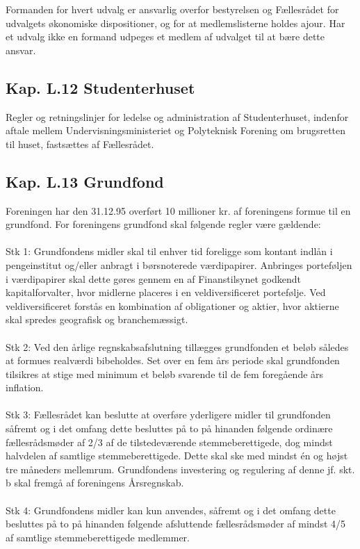 \begin{list}
\item Formanden for hvert udvalg er ansvarlig overfor bestyrelsen og Fællesrådet for udvalgets økonomiske dispositioner, og for at medlemslisterne holdes ajour. Har et udvalg ikke en formand udpeges et medlem af udvalget til at bære dette ansvar.



\subsection{Kap. L.12 Studenterhuset}
\item Regler og retningslinjer for ledelse og administration af Studenterhuset, indenfor aftale mellem Undervisningsministeriet og Polyteknisk Forening om brugsretten til huset, fastsættes af Fællesrådet.




\subsection{Kap. L.13 Grundfond}
\label{kapL:grundfond}
\item \label{L:grund:stor} Foreningen har den 31.12.95 overført 10 millioner kr. af foreningens formue til en grundfond.
For foreningens grundfond skal følgende regler være gældende:
\\
\\Stk 1: Grundfondens midler skal til enhver tid foreligge som kontant indlån i pengeinstitut og/eller anbragt i børsnoterede værdipapirer. Anbringes porteføljen i værdipapirer skal dette gøres gennem en af Finanstilsynet godkendt kapitalforvalter, hvor midlerne placeres i en veldiversificeret portefølje. Ved veldiversificeret forstås en kombination af obligationer og aktier, hvor aktierne skal spredes geografisk og branchemæssigt.
\\
\\Stk 2: Ved den årlige regnskabsafslutning tillægges grundfonden et beløb således at formues realværdi bibeholdes. Set over en fem års periode skal grundfonden tilsikres at stige med minimum et beløb svarende til de fem foregående års inflation.
\\
\\
Stk 3: Fællesrådet kan beslutte at overføre yderligere midler til grundfonden såfremt og i det omfang dette besluttes på to på hinanden følgende ordinære fællesrådsmøder af 2/3 af de tilstedeværende stemmeberettigede, dog mindst halvdelen af samtlige stemmeberettigede. Dette skal ske med mindst én og højst tre måneders mellemrum. Grundfondens investering og regulering af denne jf. skt. b skal fremgå af foreningens Årsregnskab.
\\
\\
Stk 4: Grundfondens midler kan kun anvendes, såfremt og i det omfang dette besluttes på to på hinanden følgende afsluttende fællesrådsmøder af mindst 4/5 af samtlige stemmeberettigede medlemmer. 


\end{list}
